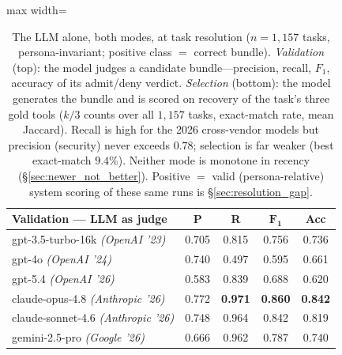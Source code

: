 \documentclass[sigconf,review,anonymous]{acmart}
\begin{document}
\begin{table}[!t]
\centering
\caption{The LLM alone, both modes, at task resolution ($n=1{,}157$ tasks, persona-invariant; positive class $=$ correct bundle). \emph{Validation} (top): the model judges a candidate bundle---precision, recall, $F_1$, accuracy of its admit/deny verdict. \emph{Selection} (bottom): the model generates the bundle and is scored on recovery of the task's three gold tools ($k/3$ counts over all $1{,}157$ tasks, exact-match rate, mean Jaccard). Recall is high for the 2026 cross-vendor models but precision (security) never exceeds $0.78$; selection is far weaker (best exact-match $9.4\%$). Neither mode is monotone in recency (\S\ref{sec:newer_not_better}). Positive $=$ valid (persona-relative) system scoring of these same runs is \S\ref{sec:resolution_gap}.}
\label{tab:llm_pr}
\footnotesize
\setlength{\tabcolsep}{5pt}
\begin{adjustbox}{max width=\columnwidth}
\begin{tabular}{@{}lcccc@{}}
\toprule
\textbf{Validation --- LLM as judge} & \textbf{P} & \textbf{R} & $\mathbf{F_1}$ & \textbf{Acc} \\
\midrule
gpt-3.5-turbo-16k \textit{(OpenAI '23)}    & 0.705 & 0.815 & 0.756 & 0.736 \\
gpt-4o \textit{(OpenAI '24)}               & 0.740 & 0.497 & 0.595 & 0.661 \\
gpt-5.4 \textit{(OpenAI '26)}              & 0.583 & 0.839 & 0.688 & 0.620 \\
claude-opus-4.8 \textit{(Anthropic '26)}   & 0.772 & \textbf{0.971} & \textbf{0.860} & \textbf{0.842} \\
claude-sonnet-4.6 \textit{(Anthropic '26)} & 0.748 & 0.964 & 0.842 & 0.819 \\
gemini-2.5-pro \textit{(Google '26)}       & 0.666 & 0.962 & 0.787 & 0.740 \\
\bottomrule
\end{tabular}
\end{adjustbox}


\end{table}
\end{document}
